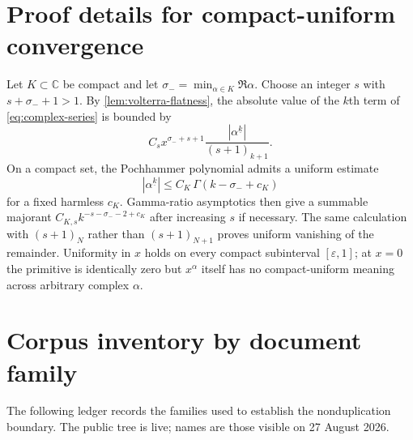 \documentclass[11pt,oneside]{article}
\numberwithin{equation}{section}
\theoremstyle{definition}
\theoremstyle{remark}
\newcommand{\C}{\mathbb C}
\newcommand{\fall}[2]{#1^{\underline{#2}}}
\newcommand{\abs}[1]{\left|#1\right|}
\begin{document}
\appendix
\section{Proof details for compact-uniform convergence}
\label{app:uniform}

Let $K\subset\C$ be compact and let
$\sigma_- =\min_{\alpha\in K}\Re\alpha$.  Choose an integer $s$ with
$s+\sigma_-+1>1$.  By \cref{lem:volterra-flatness}, the absolute value of the
$k$th term of \eqref{eq:complex-series} is bounded by
\begin{equation}
 C_s x^{\sigma_-+s+1}
 \frac{\abs{\fall{\alpha}{k}}}{(s+1)_{k+1}}.              \label{eq:uniform-term-bound}
\end{equation}
On a compact set, the Pochhammer polynomial admits a uniform estimate
\begin{equation}
 \abs{\fall{\alpha}{k}}\le C_K\,\Gamma(k-\sigma_-+c_K)   \label{eq:pochhammer-uniform}
\end{equation}
for a fixed harmless $c_K$.  Gamma-ratio asymptotics then give a summable
majorant $C_{K,s}k^{-s-\sigma_- -2+c_K}$ after increasing $s$ if necessary.
The same calculation with $(s+1)_N$ rather than $(s+1)_{N+1}$ proves uniform
vanishing of the remainder.  Uniformity in $x$ holds on every compact
subinterval $[\varepsilon,1]$; at $x=0$ the primitive is identically zero but
$x^\alpha$ itself has no compact-uniform meaning across arbitrary complex
$\alpha$.

\section{Corpus inventory by document family}
\label{app:corpus}

The following ledger records the families used to establish the nonduplication
boundary.  The public tree is live; names are those visible on 27 August 2026.
\end{document}
